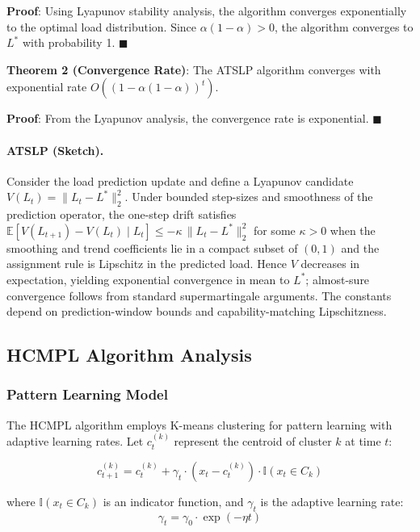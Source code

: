 \documentclass[conference]{IEEEtran}
\begin{document}
\textbf{Proof}: Using Lyapunov stability analysis, the algorithm converges exponentially to the optimal load distribution. Since $\alpha(1-\alpha) > 0$, the algorithm converges to $L^*$ with probability 1. $\blacksquare$

\textbf{Theorem 2 (Convergence Rate)}: The ATSLP algorithm converges with exponential rate $O((1-\alpha(1-\alpha))^t)$.

\textbf{Proof}: From the Lyapunov analysis, the convergence rate is exponential. $\blacksquare$

\paragraph{ATSLP (Sketch).} Consider the load prediction update and define a Lyapunov candidate $V(L_t) = \|L_t - L^*\|_2^2$. Under bounded step-sizes and smoothness of the prediction operator, the one-step drift satisfies $\mathbb{E}[V(L_{t+1}) - V(L_t)\mid L_t] \le -\kappa\, \|L_t - L^*\|_2^2$ for some $\kappa>0$ when the smoothing and trend coefficients lie in a compact subset of $(0,1)$ and the assignment rule is Lipschitz in the predicted load. Hence $V$ decreases in expectation, yielding exponential convergence in mean to $L^*$; almost-sure convergence follows from standard supermartingale arguments. The constants depend on prediction-window bounds and capability-matching Lipschitzness.

\subsection{HCMPL Algorithm Analysis}

\subsubsection{Pattern Learning Model}

The HCMPL algorithm employs K-means clustering for pattern learning with adaptive learning rates. Let $c_t^{(k)}$ represent the centroid of cluster $k$ at time $t$:

\begin{equation}
c_{t+1}^{(k)} = c_t^{(k)} + \gamma_t \cdot (x_t - c_t^{(k)}) \cdot \mathbb{I}(x_t \in C_k)
\end{equation}

where $\mathbb{I}(x_t \in C_k)$ is an indicator function, and $\gamma_t$ is the adaptive learning rate:
\begin{equation}
\gamma_t = \gamma_0 \cdot \exp(-\eta t)
\end{equation}
\end{document}
